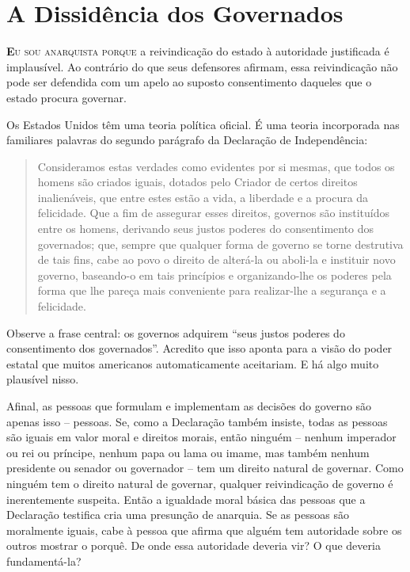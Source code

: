 
\chapter{A Dissidência dos Governados}
\label{chap:1}

\lettrine[lines=2]{\textcolor{LettrineColor}{\textbf{E}}}{u sou anarquista porque} a reivindicação do estado à autoridade justificada é implausível. Ao contrário do que seus defensores afirmam, essa reivindicação não pode ser defendida com um apelo ao suposto consentimento daqueles que o estado procura governar.

Os Estados Unidos têm uma teoria política oficial. É uma teoria incorporada nas familiares palavras do segundo parágrafo da Declaração de Independência:

\begin{quote}
Consideramos estas verdades como evidentes por si mesmas, que todos os homens são criados iguais, dotados pelo Criador de certos direitos inalienáveis, que entre estes estão a vida, a liberdade e a procura da felicidade. Que a fim de assegurar esses direitos, governos são instituídos entre os homens, derivando seus justos poderes do consentimento dos governados; que, sempre que qualquer forma de governo se torne destrutiva de tais fins, cabe ao povo o direito de alterá-la ou aboli-la e instituir novo governo, baseando-o em tais princípios e organizando-lhe os poderes pela forma que lhe pareça mais conveniente para realizar-lhe a segurança e a felicidade.
\end{quote}

Observe a frase central: os governos adquirem ``seus justos poderes do consentimento dos governados''. Acredito que isso aponta para a visão do poder estatal que muitos americanos automaticamente aceitariam. E há algo muito plausível nisso.

Afinal, as pessoas que formulam e implementam as decisões do governo são apenas isso -- pessoas. Se, como a Declaração também insiste, todas as pessoas são iguais em valor moral e direitos morais, então ninguém -- nenhum imperador ou rei ou príncipe, nenhum papa ou lama ou imame, mas também nenhum presidente ou senador ou governador -- tem um direito natural de governar. Como ninguém tem o direito natural de governar, qualquer reivindicação de governo é inerentemente suspeita. Então a igualdade moral básica das pessoas que a Declaração testifica cria uma presunção de anarquia. Se as pessoas são moralmente iguais, cabe à pessoa que afirma que alguém tem autoridade sobre os outros mostrar o porquê. De onde essa autoridade deveria vir? O que deveria fundamentá-la?

